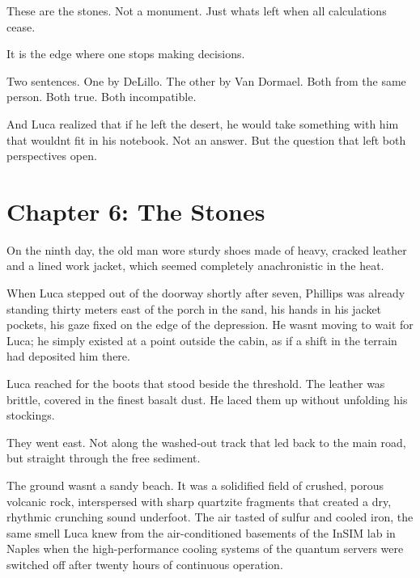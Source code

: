 \documentclass[
  ngerman,
]{article}
\begin{document}
These are the stones. Not a monument. Just what\textquotesingle s left
when all calculations cease.

It is the edge where one stops making decisions.

Two sentences. One by DeLillo. The other by Van Dormael. Both from the
same person. Both true. Both incompatible.

And Luca realized that if he left the desert, he would take something
with him that wouldn\textquotesingle t fit in his notebook. Not an
answer. But the question that left both perspectives open.

\section{}\label{section-1}

\section{\texorpdfstring{\textbf{Chapter 6: The
Stones}}{Chapter 6: The Stones}}\label{chapter-6-the-stones}

On the ninth day, the old man wore sturdy shoes made of heavy, cracked
leather and a lined work jacket, which seemed completely anachronistic
in the heat.

When Luca stepped out of the doorway shortly after seven, Phillips was
already standing thirty meters east of the porch in the sand, his hands
in his jacket pockets, his gaze fixed on the edge of the depression. He
wasn\textquotesingle t moving to wait for Luca; he simply existed at a
point outside the cabin, as if a shift in the terrain had deposited him
there.

Luca reached for the boots that stood beside the threshold. The leather
was brittle, covered in the finest basalt dust. He laced them up without
unfolding his stockings.

They went east. Not along the washed-out track that led back to the main
road, but straight through the free sediment.

The ground wasn\textquotesingle t a sandy beach. It was a solidified
field of crushed, porous volcanic rock, interspersed with sharp
quartzite fragments that created a dry, rhythmic crunching sound
underfoot. The air tasted of sulfur and cooled iron, the same smell Luca
knew from the air-conditioned basements of the InSIM lab in Naples when
the high-performance cooling systems of the quantum servers were
switched off after twenty hours of continuous operation.
\end{document}
